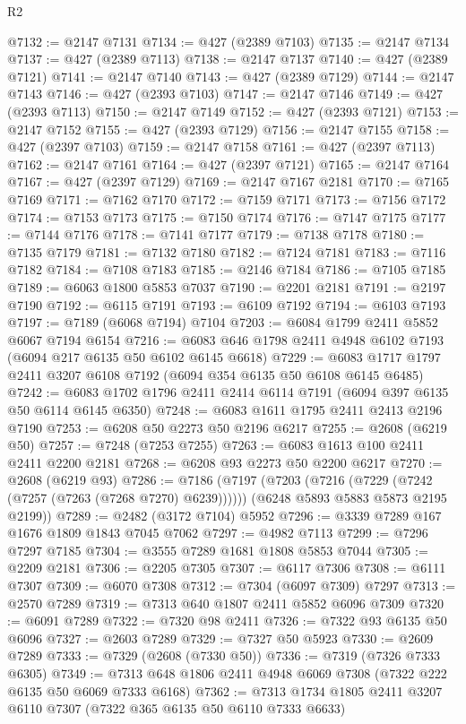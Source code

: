 \begin{lexlean}{R2}
\begin{coremodule}
@7132 := @2147 @7131
@7134 := @427 (@2389 @7103)
@7135 := @2147 @7134
@7137 := @427 (@2389 @7113)
@7138 := @2147 @7137
@7140 := @427 (@2389 @7121)
@7141 := @2147 @7140
@7143 := @427 (@2389 @7129)
@7144 := @2147 @7143
@7146 := @427 (@2393 @7103)
@7147 := @2147 @7146
@7149 := @427 (@2393 @7113)
@7150 := @2147 @7149
@7152 := @427 (@2393 @7121)
@7153 := @2147 @7152
@7155 := @427 (@2393 @7129)
@7156 := @2147 @7155
@7158 := @427 (@2397 @7103)
@7159 := @2147 @7158
@7161 := @427 (@2397 @7113)
@7162 := @2147 @7161
@7164 := @427 (@2397 @7121)
@7165 := @2147 @7164
@7167 := @427 (@2397 @7129)
@7169 := @2147 @7167 @2181
@7170 := @7165 @7169
@7171 := @7162 @7170
@7172 := @7159 @7171
@7173 := @7156 @7172
@7174 := @7153 @7173
@7175 := @7150 @7174
@7176 := @7147 @7175
@7177 := @7144 @7176
@7178 := @7141 @7177
@7179 := @7138 @7178
@7180 := @7135 @7179
@7181 := @7132 @7180
@7182 := @7124 @7181
@7183 := @7116 @7182
@7184 := @7108 @7183
@7185 := @2146 @7184
@7186 := @7105 @7185
@7189 := @6063 @1800 @5853 @7037
@7190 := @2201 @2181
@7191 := @2197 @7190
@7192 := @6115 @7191
@7193 := @6109 @7192
@7194 := @6103 @7193
@7197 := @7189 (@6068 @7194) @7104
@7203 := @6084 @1799 @2411 @5852 @6067 @7194 @6154
@7216 := @6083 @646 @1798 @2411 @4948 @6102 @7193 (@6094 @217 @6135 @50 @6102 @6145 @6618)
@7229 := @6083 @1717 @1797 @2411 @3207 @6108 @7192 (@6094 @354 @6135 @50 @6108 @6145 @6485)
@7242 := @6083 @1702 @1796 @2411 @2414 @6114 @7191 (@6094 @397 @6135 @50 @6114 @6145 @6350)
@7248 := @6083 @1611 @1795 @2411 @2413 @2196 @7190
@7253 := @6208 @50 @2273 @50 @2196 @6217
@7255 := @2608 (@6219 @50)
@7257 := @7248 (@7253 @7255)
@7263 := @6083 @1613 @100 @2411 @2411 @2200 @2181
@7268 := @6208 @93 @2273 @50 @2200 @6217
@7270 := @2608 (@6219 @93)
@7286 := @7186
    (@7197
      (@7203 (@7216 (@7229 (@7242 (@7257 (@7263 (@7268 @7270) @6239))))))
      (@6248 @5893 @5883 @5873 @2195 @2199))
@7289 := @2482 (@3172 @7104) @5952
@7296 := @3339 @7289 @167 @1676 @1809 @1843 @7045 @7062
@7297 := @4982 @7113
@7299 := @7296 @7297 @7185
@7304 := @3555 @7289 @1681 @1808 @5853 @7044
@7305 := @2209 @2181
@7306 := @2205 @7305
@7307 := @6117 @7306
@7308 := @6111 @7307
@7309 := @6070 @7308
@7312 := @7304 (@6097 @7309) @7297
@7313 := @2570 @7289
@7319 := @7313 @640 @1807 @2411 @5852 @6096 @7309
@7320 := @6091 @7289
@7322 := @7320 @98 @2411
@7326 := @7322 @93 @6135 @50 @6096
@7327 := @2603 @7289
@7329 := @7327 @50 @5923
@7330 := @2609 @7289
@7333 := @7329 (@2608 (@7330 @50))
@7336 := @7319 (@7326 @7333 @6305)
@7349 := @7313 @648 @1806 @2411 @4948 @6069 @7308 (@7322 @222 @6135 @50 @6069 @7333 @6168)
@7362 := @7313 @1734 @1805 @2411 @3207 @6110 @7307 (@7322 @365 @6135 @50 @6110 @7333 @6633)

\end{coremodule}
\end{lexlean}
